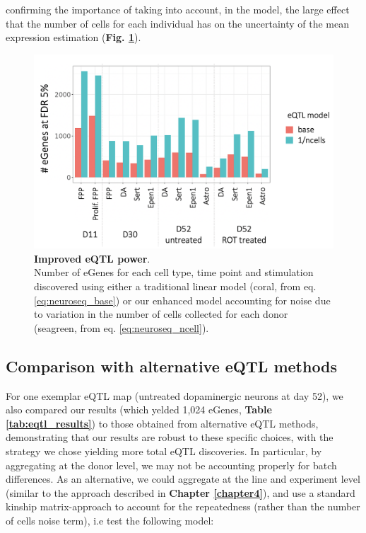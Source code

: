 confirming the importance of taking into account, in the model, the large effect that the number of cells for each individual has on the 
uncertainty
of the mean expression estimation (\textbf{Fig. \ref{fig:neuroseq_eqtl_improved_power}}).



\begin{figure}[h]
\centering
\includegraphics[width=13cm]{Chapter5/Fig/neuroseq_eqtl_power.png}
\caption[Improved eQTL power]{\textbf{Improved eQTL power}.\\
Number of eGenes for each cell type, time point and stimulation discovered using either a traditional linear model (coral, from eq. \eqref{eq:neuroseq_base}) or our enhanced model accounting for noise due to variation in the number of cells collected for each donor (seagreen, from eq. \eqref{eq:neuroseq_ncell}).}
\label{fig:neuroseq_eqtl_improved_power}
\end{figure}


\subsection{Comparison with alternative eQTL methods}

For one exemplar eQTL map (untreated dopaminergic neurons at day 52), we also compared our results (which yelded 1,024 eGenes, \textbf{Table \ref{tab:eqtl_results}}) to those obtained from alternative eQTL methods, demonstrating that our results are robust to these specific choices, with the strategy we chose yielding more total eQTL discoveries. 
In particular, by aggregating at the donor level, we may not be accounting properly for batch differences.
As an alternative, we could aggregate at the line and experiment level (similar to the approach described in \textbf{Chapter 
\ref{chapter4}}), and use a standard kinship matrix-approach to account for the repeatedness (rather than the number of cells noise term), i.e test the following model:


